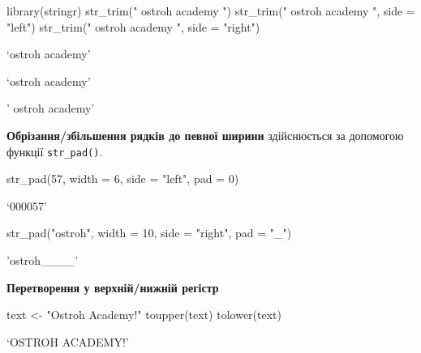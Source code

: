 \documentclass[
  letterpaper,
  DIV=11,
  numbers=noendperiod]{scrreprt}
\newenvironment{Shaded}{\begin{snugshade}}{\end{snugshade}}
\newcommand{\AttributeTok}[1]{\textcolor[rgb]{0.40,0.45,0.13}{#1}}
\newcommand{\DecValTok}[1]{\textcolor[rgb]{0.68,0.00,0.00}{#1}}
\newcommand{\FunctionTok}[1]{\textcolor[rgb]{0.28,0.35,0.67}{#1}}
\newcommand{\NormalTok}[1]{\textcolor[rgb]{0.00,0.23,0.31}{#1}}
\newcommand{\OtherTok}[1]{\textcolor[rgb]{0.00,0.23,0.31}{#1}}
\newcommand{\StringTok}[1]{\textcolor[rgb]{0.13,0.47,0.30}{#1}}
\begin{document}
\begin{Shaded}
\begin{Highlighting}[]
\FunctionTok{library}\NormalTok{(stringr)}
\FunctionTok{str\_trim}\NormalTok{(}\StringTok{" ostroh academy  "}\NormalTok{)}
\FunctionTok{str\_trim}\NormalTok{(}\StringTok{" ostroh academy "}\NormalTok{, }\AttributeTok{side =} \StringTok{"left"}\NormalTok{)}
\FunctionTok{str\_trim}\NormalTok{(}\StringTok{" ostroh academy "}\NormalTok{, }\AttributeTok{side =} \StringTok{"right"}\NormalTok{)}
\end{Highlighting}
\end{Shaded}

`ostroh academy'

`ostroh academy'

' ostroh academy'

\textbf{Обрізання/збільшення рядків до певної ширини} здійснюється за
допомогою функції \texttt{str\_pad()}.

\begin{Shaded}
\begin{Highlighting}[]
\FunctionTok{str\_pad}\NormalTok{(}\DecValTok{57}\NormalTok{, }\AttributeTok{width =} \DecValTok{6}\NormalTok{, }\AttributeTok{side =} \StringTok{"left"}\NormalTok{, }\AttributeTok{pad =} \DecValTok{0}\NormalTok{)}
\end{Highlighting}
\end{Shaded}

`000057'

\begin{Shaded}
\begin{Highlighting}[]
\FunctionTok{str\_pad}\NormalTok{(}\StringTok{"ostroh"}\NormalTok{, }\AttributeTok{width =} \DecValTok{10}\NormalTok{, }\AttributeTok{side =} \StringTok{"right"}\NormalTok{, }\AttributeTok{pad =} \StringTok{"\_"}\NormalTok{)}
\end{Highlighting}
\end{Shaded}

'ostroh\_\_\_\_'

\textbf{Перетворення у верхній/нижній регістр}

\begin{Shaded}
\begin{Highlighting}[]
\NormalTok{text }\OtherTok{\textless{}{-}} \StringTok{"Ostroh Academy!"}
\FunctionTok{toupper}\NormalTok{(text)}
\FunctionTok{tolower}\NormalTok{(text)}
\end{Highlighting}
\end{Shaded}

`OSTROH ACADEMY!'
\end{document}
